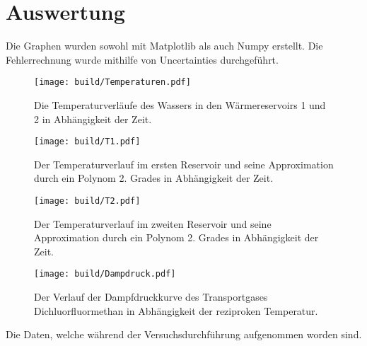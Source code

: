 \section{Auswertung}
\label{sec:Auswertung}



Die Graphen wurden sowohl mit Matplotlib\cite{matplotlib} als auch Numpy\cite{numpy} erstellt. Die
 Fehlerrechnung wurde mithilfe von Uncertainties\cite{uncertainties} durchgeführt.





 \begin{figure}
 	\centering
 	\caption{Die Temperaturverläufe des Wassers in den Wärmereservoirs 1 und 2 in Abhängigkeit der Zeit.}
 	\texttt{[image: build/Temperaturen.pdf]}
 	\label{fig:Graph1}
 \end{figure}
 \begin{figure}
 	\centering
 	\caption{Der Temperaturverlauf im ersten Reservoir und seine Approximation durch ein Polynom 2. Grades in Abhängigkeit der Zeit.}
 	\texttt{[image: build/T1.pdf]}
 	\label{fig:Graph1}
 \end{figure}
 \begin{figure}
 	\centering
 	\caption{Der Temperaturverlauf im zweiten Reservoir und seine Approximation durch ein Polynom 2. Grades in Abhängigkeit der Zeit.}
 	\texttt{[image: build/T2.pdf]}
 	\label{fig:Graph1}
 \end{figure}
 \begin{figure}
 	\centering
 	\caption{Der Verlauf der Dampfdruckkurve des Transportgases Dichluorfluormethan in Abhängigkeit der reziproken Temperatur.}
 	\texttt{[image: build/Dampdruck.pdf]}
 	\label{fig:Graph1}
 \end{figure}

 \begin{table}
   \centering
   \caption{Die Daten, welche während der Versuchsdurchführung aufgenommen worden sind.}
   \label{tab:daten}
 \end{table}








